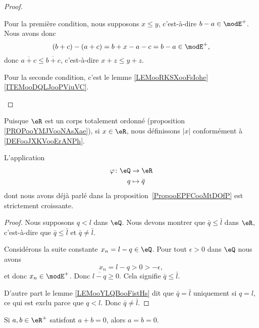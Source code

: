 \begin{proof}
\begin{subproof}
		Pour la première condition, nous supposons \( x\leq y\), c'est-à-dire \( b-a\in \modE^+\). Nous avons donc
		\begin{equation}
			(b+c)-(a+c)=b+x-a-c=b-a\in \modE^+,
		\end{equation}
		donc \( \overline{ a+c }\leq \overline{ b+c }\), c'est-à-dire \( x+z\leq y+z\).

		Pour la seconde condition, c'est le lemme \ref{LEMooRKSXooFsIohe}\ref{ITEMooDQLJooPViuVC}.
	\end{subproof}
\end{proof}


\begin{definition}
	Puisque \( \eR\) est un corps totalement ordonné (proposition \ref{PROPooYMJVooNAsXae}), si \( x\in \eR\), nous définissons \( | x |\) conformément à \ref{DEFooJXKVooErANPh}.
\end{definition}

\begin{lemma}       \label{LEMooTJAXooKEqPCG}
	L'application
	\begin{equation}
		\begin{aligned}
			\varphi\colon \eQ & \to \eR        \\
			q                 & \mapsto \bar q
		\end{aligned}
	\end{equation}
	dont nous avons déjà parlé dans la proposition~\ref{PropooEPFCooMtDOfP} est strictement croissante.
\end{lemma}

\begin{proof}
	Nous supposons \( q< l\) dans \( \eQ\). Nous devons montrer que \( \bar q\leq \bar l\) dans \( \eR\), c'est-à-dire que \( \bar q\leq \bar l\) et \( \bar q\neq \bar l\).

	Considérons la suite constante \( x_n=l-q\in \eQ\). Pour tout \( \epsilon>0\) dans \( \eQ\) nous avons
	\begin{equation}
		x_n=l-q>0>-\epsilon,
	\end{equation}
	et donc \( x_n\in\modE^+\). Donc \( \overline{ l-q }\geq 0\). Cela signifie \( \bar q\leq \bar l\).

	D'autre part le lemme \ref{LEMooYLQBooFistHs} dit que \( \bar q=\bar l\) uniquement si \( q=l\), ce qui est exclu parce que \( q<l\). Donc \( \bar q\neq\bar l\).
\end{proof}

\begin{lemma}       \label{LEMooNHMTooEdtBnQ}
	Si \( a,b\in \eR^+\) satisfont \( a+b=0\), alors \( a=b=0\).
\end{lemma}

